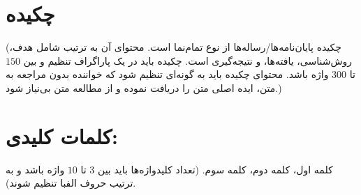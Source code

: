 \section*{چکیده}
(چکیده پایان‌نامه‌ها/رساله‌ها از نوع تمام‌نما است. محتوای آن به ترتیب شامل هدف، روش‌شناسی، یافته‌ها، و نتیجه‌گیری است. چکیده باید در یک پاراگراف تنظیم و بین $150$ تا $300$ واژه باشد. محتوای چکیده باید به گونه‌ای تنظیم شود که خواننده بدون مراجعه به متن، ایده اصلی متن را دریافت نموده و از مطالعه متن بی‌نیاز شود.)

\vfil

\section*{کلمات کلیدی:}
کلمه اول، کلمه دوم، کلمه سوم. (تعداد کلید‌واژه‌ها باید بین $3$ تا $10$ واژه باشد و به ترتیب حروف الفبا تنظیم شوند).